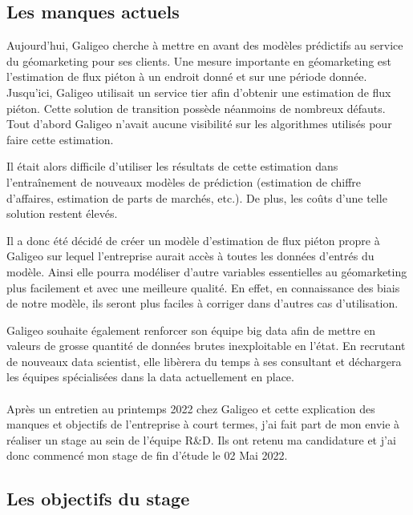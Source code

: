 \subsection{Les manques actuels}

Aujourd’hui, Galigeo cherche à mettre en avant des modèles prédictifs au service du géomarketing pour ses clients. Une mesure importante en géomarketing est l’estimation de flux piéton à un endroit donné et sur une période donnée. Jusqu’ici, Galigeo utilisait un service tier afin d’obtenir une estimation de flux piéton. Cette solution de transition possède néanmoins de nombreux défauts. Tout d’abord Galigeo n’avait aucune visibilité sur les algorithmes utilisés pour faire cette estimation.

Il était alors difficile d’utiliser les résultats de cette estimation dans l’entraînement de nouveaux modèles de prédiction (estimation de chiffre d’affaires, estimation de parts de marchés, etc.). De plus, les coûts d’une telle solution restent élevés.

Il a donc été décidé de créer un modèle d’estimation de flux piéton propre à Galigeo sur lequel l’entreprise aurait accès à toutes les données d’entrés du modèle. Ainsi elle pourra modéliser d’autre variables essentielles au géomarketing plus facilement et avec une meilleure qualité. En effet, en connaissance des biais de notre modèle, ils seront plus faciles à corriger dans d’autres cas d’utilisation.

Galigeo souhaite également renforcer son équipe big data afin de mettre en valeurs de grosse quantité de données brutes inexploitable en l’état. En recrutant de nouveaux data scientist, elle libèrera du temps à ses consultant et déchargera les équipes spécialisées dans la data actuellement en place.

\paragraph*{}

Après un entretien au printemps 2022 chez Galigeo et cette explication des manques et objectifs de l’entreprise à court termes, j’ai fait part de mon envie à réaliser un stage au sein de l’équipe R\&D. Ils ont retenu ma candidature et j’ai donc commencé mon stage de fin d’étude le 02 Mai 2022.


\subsection{Les objectifs du stage}


